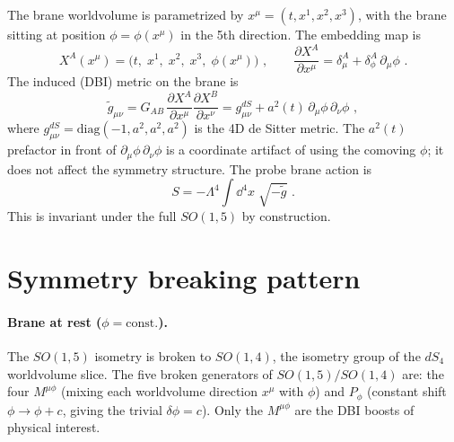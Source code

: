 \documentclass[11pt]{article}
\begin{document}
The brane worldvolume is parametrized by $x^\mu = (t, x^1, x^2, x^3)$, with the brane sitting at position
$\phi = \phi(x^\mu)$ in the 5th direction.  The embedding map is
\begin{equation}
\label{eq:embedding}
X^A(x^\mu) = \bigl(t,\; x^1,\; x^2,\; x^3,\; \phi(x^\mu)\bigr) \,\,,
\qquad
\frac{\partial X^A}{\partial x^\mu} = \delta^A_\mu + \delta^A_\phi\,\partial_\mu\phi \,\,.
\end{equation}
The induced (DBI) metric on the brane is
\begin{equation}
\label{eq:induced-metric}
\tilde{g}_{\mu\nu}
= G_{AB}\,\frac{\partial X^A}{\partial x^\mu}\frac{\partial X^B}{\partial x^\nu}
= g^{dS}_{\mu\nu} + a^2(t)\,\partial_\mu\phi\,\partial_\nu\phi \,\,,
\end{equation}
where $g^{dS}_{\mu\nu} = \mathrm{diag}(-1, a^2, a^2, a^2)$ is the 4D de Sitter metric.  The
$a^2(t)$ prefactor in front of $\partial_\mu\phi\,\partial_\nu\phi$ is a coordinate artifact of
using the comoving $\phi$; it does not affect the symmetry structure.  The probe brane action is
\begin{equation}
\label{eq:action}
S = -\Lambda^4 \int \dd^4 x\; \sqrt{-\tilde{g}} \,\,.
\end{equation}
This is invariant under the full $SO(1,5)$ by construction.

\section{Symmetry breaking pattern}

\paragraph{Brane at rest ($\phi = \text{const.}$).}
The $SO(1,5)$ isometry is broken to $SO(1,4)$, the isometry group of the $dS_4$ worldvolume slice.
The five broken generators of $SO(1,5)/SO(1,4)$ are: the four $M^{\mu\phi}$ (mixing each worldvolume
direction $x^\mu$ with $\phi$) and $P_\phi$ (constant shift $\phi \to \phi + c$, giving the trivial
$\delta\phi = c$).  Only the $M^{\mu\phi}$ are the DBI boosts of physical interest.
\end{document}
